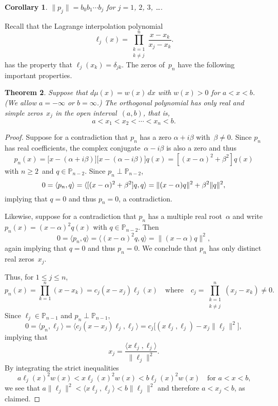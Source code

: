\documentclass[12pt,a4paper]{article}
\newtheorem{theorem}{Theorem}
\newtheorem{corollary}[theorem]{Corollary}
\newcommand{\iprod}[1]{\langle#1\rangle}
\newcommand{\Poly}{\mathbb{P}}
\begin{document}
\begin{corollary}
$\|p_j\|=b_0b_1\cdots b_j$ for $j=1$, $2$, $3$, \dots.
\end{corollary}

Recall that the Lagrange interpolation polynomial
\[
\ell_j(x)=\prod_{\substack{k=1\\ k\ne j}}^n\frac{x-x_k}{x_j-x_k}.
\]
has the property that $\ell_j(x_k)=\delta_{jk}$. The zeros of~$p_n$ 
have the following important properties.  

\begin{theorem}
Suppose that $d\mu(x)=w(x)\,dx$ with $w(x)>0$ for $a<x<b$.
(We allow $a=-\infty$ or $b=\infty$.) The orthogonal polynomial has 
only real and simple zeros~$x_j$ in the open interval~$(a,b)$, that 
is,
\[
a<x_1<x_2<\cdots<x_n<b.
\]
\end{theorem}
\begin{proof}
Suppose for a contradiction that $p_n$ has a zero $\alpha+i\beta$ 
with~$\beta\ne0$.  Since $p_n$ has real coefficients, 
the complex conjugate~$\alpha-i\beta$ is also a zero and thus
\[
p_n(x)=\bigl[x-(\alpha+i\beta)\bigr]\bigl[x-(\alpha-i\beta)\bigr]q(x)
	=[(x-\alpha)^2+\beta^2]q(x)
\]
with $n\ge2$~and $q\in\Poly_{n-2}$. Since $p_n\perp\Poly_{n-2}$,
\[
0=\iprod{p_n,q}=\iprod{[(x-\alpha)^2+\beta^2]q,q}\\
	=\|(x-\alpha)q\|^2+\beta^2\|q\|^2,
\]
implying that $q=0$ and thus $p_n=0$, a contradiction.

Likewise, suppose for a contradiction that $p_n$ has a multiple real 
root~$\alpha$ and write $p_n(x)=(x-\alpha)^2q(x)$ with 
$q\in\Poly_{n-2}$.  Then
\[
0=\iprod{p_n,q}=\iprod{(x-\alpha)^2q,q}=\|(x-\alpha)q\|^2,
\]
again implying that $q=0$ and thus $p_n=0$.  We conclude that $p_n$ 
has only distinct real zeros~$x_j$.

Thus, for $1\le j\le n$,
\[
p_n(x)=\prod_{k=1}^n(x-x_k)=c_j(x-x_j)\ell_j(x)
\quad\text{where}\quad
c_j=\prod_{\substack{k=1\\ k\ne j}}^n(x_j-x_k)\ne0.
\]
Since $\ell_j\in\Poly_{n-1}$ and $p_n\perp\Poly_{n-1}$,
\[
0=\iprod{p_n,\ell_j}=\iprod{c_j(x-x_j)\ell_j,\ell_j}
	=c_j\bigl[(x\ell_j,\ell_j)-x_j\|\ell_j\|^2\bigr],
\]
implying that
\[
x_j=\frac{\iprod{x\ell_j,\ell_j}}{\|\ell_j\|^2}.
\]
By integrating the strict inequalities
\[
a\ell_j(x)^2w(x)<x\ell_j(x)^2w(x)<b\ell_j(x)^2w(x)
	\quad\text{for $a<x<b$,}
\]
we see that $a\|\ell_j\|^2<\iprod{x\ell_j,\ell_j}<b\|\ell_j\|^2$
and therefore $a<x_j<b$, as claimed.
\end{proof}
\end{document}
